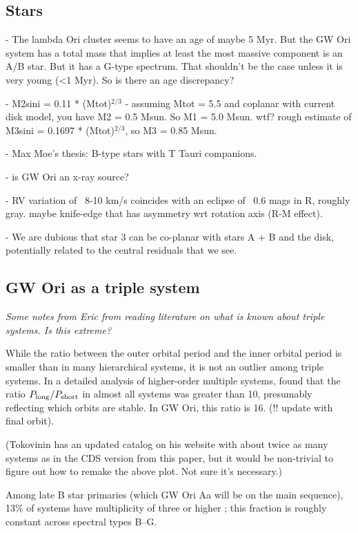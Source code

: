 \documentclass{aastex6}
\begin{document}
\subsection{Stars}

- The lambda Ori cluster seems to have an age of maybe 5 Myr.  But the GW Ori system has a total mass that implies at least the most massive component is an A/B star.  But it has a G-type spectrum.  That shouldn't be the case unless it is very young (<1 Myr).  So is there an age discrepancy?

- M2sini = 0.11 * (Mtot)$^{2/3}$
- assuming Mtot = 5.5 and coplanar with current disk model, you have M2 = 0.5 Msun.  So M1 = 5.0 Msun.  wtf?  rough estimate of M3sini = 0.1697 * (Mtot)$^{2/3}$, so M3 = 0.85 Msun.

- Max Moe's thesis: B-type stars with T Tauri companions.

- is GW Ori an x-ray source?

- RV variation of ~8-10 km/s coincides with an eclipse of ~0.6 mags in R, roughly gray.  maybe knife-edge that has asymmetry wrt rotation axis (R-M effect).

- We are dubious that star 3 can be co-planar with stars A + B and the disk, potentially related to the central residuals that we see.


\subsection{GW Ori as a triple system}

{\it Some notes from Eric from reading literature on what is known about triple systems.  Is this extreme?}

While the ratio between the outer orbital period and the inner orbital period is smaller than in many hierarchical systems, it is not an outlier among triple systems.  In a detailed analysis of higher-order multiple systems, \citet{tokovinin97} found that the ratio $P_{\rm long} / P_{\rm short}$ in almost all systems was greater than 10, presumably reflecting which orbits are stable.  In GW Ori, this ratio is 16.  (!! update with final orbit).

(Tokovinin has an updated catalog on his website with about twice as many systems as in the CDS version from this paper, but it would be non-trivial to figure out how to remake the above plot.  Not sure it's necessary.)

Among late B star primaries (which GW Ori Aa will be on the main sequence), 13\% of systems have multiplicity of three or higher \citep{eggleton08}; this fraction is roughly constant across spectral types B--G.
\end{document}
